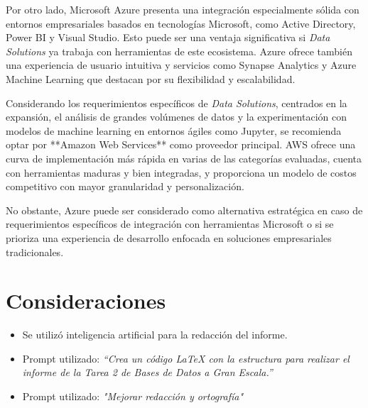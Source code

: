 \documentclass[12pt]{article}
\begin{document}
	Por otro lado, Microsoft Azure presenta una integración especialmente sólida con entornos empresariales basados en tecnologías Microsoft, como Active Directory, Power BI y Visual Studio. Esto puede ser una ventaja significativa si \textit{Data Solutions} ya trabaja con herramientas de este ecosistema. Azure ofrece también una experiencia de usuario intuitiva y servicios como Synapse Analytics y Azure Machine Learning que destacan por su flexibilidad y escalabilidad.
	
	Considerando los requerimientos específicos de \textit{Data Solutions}, centrados en la expansión, el análisis de grandes volúmenes de datos y la experimentación con modelos de machine learning en entornos ágiles como Jupyter, se recomienda optar por **Amazon Web Services** como proveedor principal. AWS ofrece una curva de implementación más rápida en varias de las categorías evaluadas, cuenta con herramientas maduras y bien integradas, y proporciona un modelo de costos competitivo con mayor granularidad y personalización.
	
	No obstante, Azure puede ser considerado como alternativa estratégica en caso de requerimientos específicos de integración con herramientas Microsoft o si se prioriza una experiencia de desarrollo enfocada en soluciones empresariales tradicionales.
	
	\section{Consideraciones}
	\begin{itemize}
		\item Se utilizó inteligencia artificial para la redacción del informe.
		\item Prompt utilizado: \textit{“Crea un código LaTeX con la estructura para realizar el informe de la Tarea 2 de Bases de Datos a Gran Escala.”}
		\item Prompt utilizado: \textit{"Mejorar redacción y ortografía"}
	\end{itemize}
	
	
\end{document}
